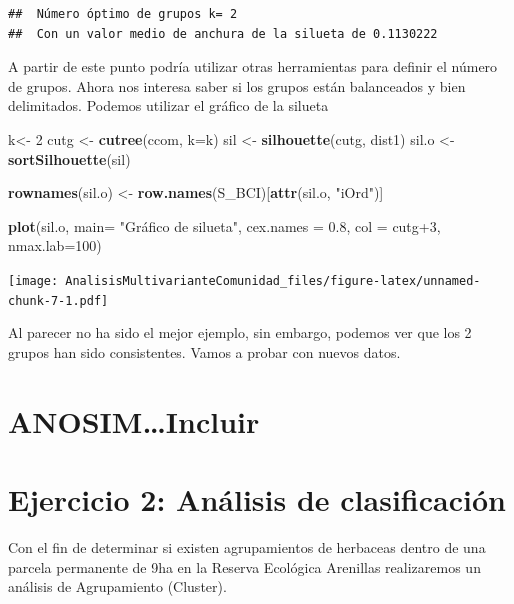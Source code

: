 \documentclass[]{book}
\newenvironment{Shaded}{\begin{snugshade}}{\end{snugshade}}
\newcommand{\KeywordTok}[1]{\textcolor[rgb]{0.13,0.29,0.53}{\textbf{{#1}}}}
\newcommand{\DataTypeTok}[1]{\textcolor[rgb]{0.13,0.29,0.53}{{#1}}}
\newcommand{\DecValTok}[1]{\textcolor[rgb]{0.00,0.00,0.81}{{#1}}}
\newcommand{\FloatTok}[1]{\textcolor[rgb]{0.00,0.00,0.81}{{#1}}}
\newcommand{\StringTok}[1]{\textcolor[rgb]{0.31,0.60,0.02}{{#1}}}
\newcommand{\NormalTok}[1]{{#1}}
\begin{document}
\begin{verbatim}
##  Número óptimo de grupos k= 2 
##  Con un valor medio de anchura de la silueta de 0.1130222
\end{verbatim}

A partir de este punto podría utilizar otras herramientas para definir
el número de grupos. Ahora nos interesa saber si los grupos están
balanceados y bien delimitados. Podemos utilizar el gráfico de la
silueta

\begin{Shaded}
\begin{Highlighting}[]
\NormalTok{k<-}\StringTok{ }\DecValTok{2}
\NormalTok{cutg <-}\StringTok{ }\KeywordTok{cutree}\NormalTok{(ccom, }\DataTypeTok{k=}\NormalTok{k)}
\NormalTok{sil <-}\StringTok{ }\KeywordTok{silhouette}\NormalTok{(cutg, dist1)}
\NormalTok{sil.o <-}\StringTok{ }\KeywordTok{sortSilhouette}\NormalTok{(sil)}

\KeywordTok{rownames}\NormalTok{(sil.o) <-}\StringTok{ }\KeywordTok{row.names}\NormalTok{(S_BCI)[}\KeywordTok{attr}\NormalTok{(sil.o, }\StringTok{"iOrd"}\NormalTok{)]}

\KeywordTok{plot}\NormalTok{(sil.o, }\DataTypeTok{main=} \StringTok{"Gráfico de silueta"}\NormalTok{, }\DataTypeTok{cex.names =} \FloatTok{0.8}\NormalTok{, }
     \DataTypeTok{col =} \NormalTok{cutg}\DecValTok{+3}\NormalTok{, }\DataTypeTok{nmax.lab=}\DecValTok{100}\NormalTok{)}
\end{Highlighting}
\end{Shaded}

\texttt{[image: AnalisisMultivarianteComunidad\_files/figure-latex/unnamed-chunk-7-1.pdf]}

Al parecer no ha sido el mejor ejemplo, sin embargo, podemos ver que los
2 grupos han sido consistentes. Vamos a probar con nuevos datos.

\section{ANOSIM\ldots{}Incluir}\label{anosimincluir}

\section{Ejercicio 2: Análisis de
clasificación}\label{ejercicio-2-analisis-de-clasificacion}

Con el fin de determinar si existen agrupamientos de herbaceas dentro de
una parcela permanente de 9ha en la Reserva Ecológica Arenillas
realizaremos un análisis de Agrupamiento (Cluster).
\end{document}
